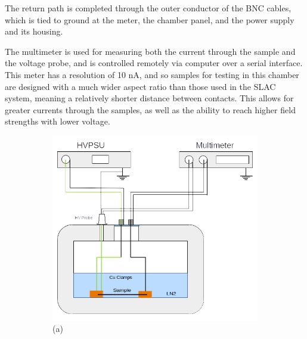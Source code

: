 \documentclass[a4paper,12pt]{article}
\begin{document}
The return path is completed through the outer conductor of the BNC cables, which is tied to ground at the meter, the chamber panel, and the power supply and its housing.

The multimeter is used for measuring both the current through the sample and the voltage probe, and is controlled remotely via computer over a serial interface.  This meter has a resolution of 10 nA, and so samples for testing in this chamber are designed with a much wider aspect ratio than those used in the SLAC system, meaning a relatively shorter distance between contacts.  This allows for greater currents through the samples, as well as the ability to reach higher field strengths with lower voltage.

\begin{figure}[htb]
\centering
\begin{subfigure}[c]{0.59\linewidth}
	\begin{center}
		\includegraphics[width=\linewidth]{MSU_styro_setup.png}
		(a)
	\end{center}
\end{subfigure}
\begin{subfigure}[c]{0.39\linewidth}
	\begin{center}
		\vspace*{4em} 
		

\end{center}
\end{subfigure}
\end{figure}
\end{document}
